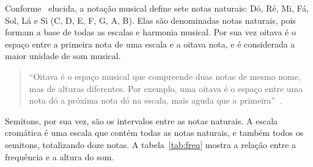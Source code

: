 \documentclass{sbrt}
\begin{document}
Conforme~\cite{moretti2003prototipo} elucida, a notação musical define sete notas naturais: Dó, Ré, Mi, Fá, Sol, Lá e Si (C, D, E, F, G, A, B). Elas são denominadas notas naturais, pois formam a base de todas as escalas e harmonia musical. Por sua vez oitava é o espaço entre a primeira nota de uma escala e a oitava nota, e é considerada a maior unidade de som musical.

\begin{quote}
  ``Oitava é o espaço musical que compreende duas notas de mesmo nome, mas de alturas diferentes. Por exemplo, uma oitava é o espaço entre uma nota dó a próxima nota dó na escala, mais aguda que a primeira''~\cite{moretti2003prototipo}.
\end{quote}

Semitons, por sua vez, são os intervalos entre as notas naturais. A escala cromática é uma escala que contém todas as notas naturais, e também todos os semitons, totalizando doze notas. A tabela~\ref{tab:freq} mostra a relação entre a frequência e a altura do som.
\end{document}
